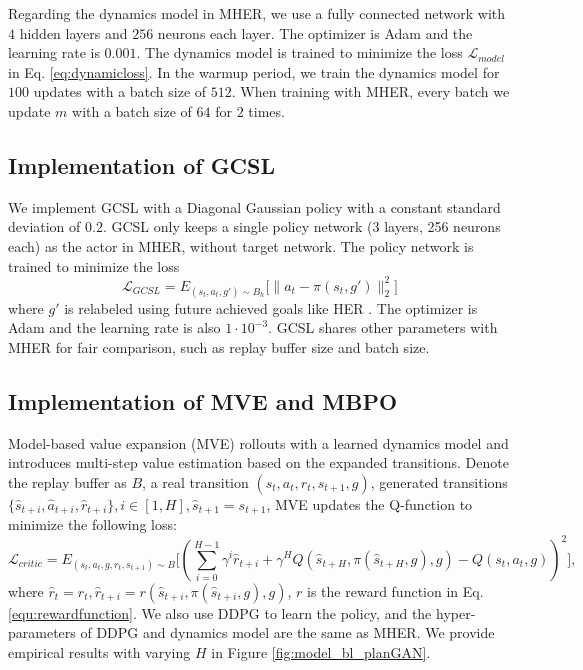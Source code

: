 \documentclass{article}
\begin{document}

Regarding the dynamics model in MHER, we use a fully connected network with $4$ hidden layers and $256$ neurons each layer. The optimizer is Adam and the learning rate is $0.001$. The dynamics model is trained to minimize the loss $\mathcal{L}_{model}$ in Eq. \ref{eq:dynamicloss}. In the warmup period, we train the dynamics model for $100$ updates with a batch size of $512$. When training with MHER, every batch we update $m$ with a batch size of $64$ for $2$ times. 





\subsection{Implementation of GCSL}
We implement GCSL with a Diagonal Gaussian policy with a constant standard deviation of $0.2$. GCSL only keeps a single policy network (3 layers, 256 neurons each) as the actor in MHER, without target network. The policy network is trained to minimize the loss 
$$\mathcal{L}_{GCSL} = E_{(s_t,a_t,g') \sim B_h} \big[\|a_t - \pi(s_t,g')\|_2^2 \big]$$
where $g'$ is relabeled using future achieved goals like HER \cite{andrychowicz2017hindsight}. The optimizer is Adam and the learning rate is also $1\cdot10^{-3}$. GCSL shares other parameters with MHER for fair comparison, such as replay buffer size and batch size.

\subsection{Implementation of MVE and MBPO}
Model-based value expansion (MVE) \cite{feinberg2018model} rollouts with a learned dynamics model and introduces multi-step value estimation based on the expanded transitions. Denote the replay buffer as $B$, a real transition $(s_t,a_t,r_t,s_{t+1},g)$, generated transitions $\{\hat s_{t+i}, \hat a_{t+i}, \hat r_{t+i}\}, i\in[1,H], \hat s_{t+1}=s_{t+1}$, MVE updates the Q-function to minimize the following loss:
\begin{equation}
\mathcal{L}_{critic}=E_{(s_t,a_t,g, r_t,s_{t+1})\sim B} \big[( \sum_{i=0}^{H-1} \gamma^i \hat r_{t+i} + \gamma^H Q (\hat s_{t+H}, \pi (\hat s_{t+H}, g), g)-Q(s_t,a_t, g))^2 \big],
\end{equation}
where $\hat r_t=r_t, \hat r_{t+i}=r(\hat s_{t+i}, \pi(\hat s_{t+i}, g), g)$, $r$ is the reward function in Eq. \ref{equ:rewardfunction}. We also use DDPG to learn the policy, and the hyper-parameters of DDPG and dynamics model are the same as MHER. We provide empirical results with varying $H$ in Figure \ref{fig:model_bl_planGAN}.
\end{document}
